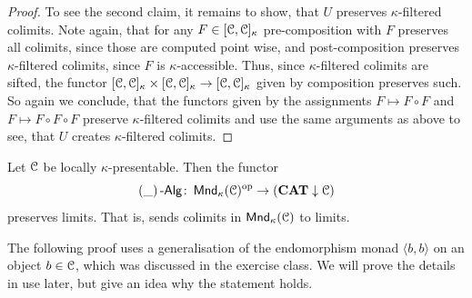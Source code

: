 \documentclass[a4paper,11pt,oneside,openany]{scrbook}
\begin{document}
\begin{proof}
   To see the second claim, it remains to show, that $U$ preserves 
   $\kappa$-filtered colimits. Note again, that for any $F \in [\operatorname{\mathcal{C}},\operatorname{\mathcal{C}}]_{\kappa}$ pre-composition with $F$ preserves all colimits, since those are computed point wise,
   and post-composition preserves $\kappa$-filtered colimits, since $F$ is $\kappa$-accessible.  Thus, since $\kappa$-filtered colimits are sifted, the functor 
   $[\operatorname{\mathcal{C}},\operatorname{\mathcal{C}}]_{\kappa} \times [\operatorname{\mathcal{C}},\operatorname{\mathcal{C}}]_{\kappa} \to [\operatorname{\mathcal{C}},\operatorname{\mathcal{C}}]_{\kappa}$ given by composition preserves such. So again we conclude, that the functors given by the 
   assignments $F \mapsto F \circ F$ and $F \mapsto F \circ F \circ F$ preserve $\kappa$-filtered colimits and use the same arguments as above to see, that
   $U$ creates $\kappa$-filtered colimits. 
\end{proof}

\begin{prop}
   Let $\operatorname{\mathcal{C}}$ be locally $\kappa$-presentable. Then the functor
      \begin{equation*}
            (\_)\operatorname{-\mathsf{Alg}} \colon \operatorname{\mathsf{Mnd}}_{\kappa}(\operatorname{\mathcal{C}})^{\operatorname{\text{op}}} \to ({\normalfont\textbf{CAT}} \downarrow \operatorname{\mathcal{C}})
      \end{equation*}
   preserves limits. That is, sends colimits in $\operatorname{\mathsf{Mnd}}_{\kappa}(\operatorname{\mathcal{C}})$ to limits. 
\end{prop}

The following proof uses a generalisation of the endomorphism monad $\langle b,b\rangle$ on an object $b \in \operatorname{\mathcal{C}}$, which was discussed in the exercise class. 
We will prove the details in use later, but give an idea why the statement holds. 
\end{document}
